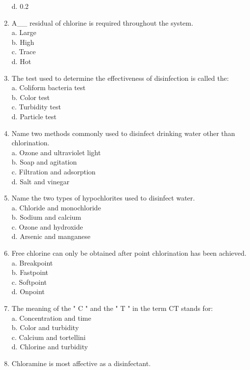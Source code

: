 \begin{enumerate}[1.]
d. 0.2\\
\item A\_\_ residual of chlorine is required throughout the system.\\
a. Large\\
b. High\\
c. Trace\\
d. Hot\\
\item The test used to determine the effectiveness of disinfection is called the:\\
a. Coliform bacteria test\\
b. Color test\\
c. Turbidity test\\
d. Particle test\\
\item Name two methods commonly used to disinfect drinking water other than chlorination.\\
a. Ozone and ultraviolet light\\
b. Soap and agitation\\
c. Filtration and adsorption\\
d. Salt and vinegar\\
\item Name the two types of hypochlorites used to disinfect water.\\
a. Chloride and monochloride\\
b. Sodium and calcium\\
c. Ozone and hydroxide\\
d. Arsenic and manganese\\
\item Free chlorine can only be obtained after point chlorination has been achieved.\\
a. Breakpoint\\
b. Fastpoint\\
c. Softpoint\\
d. Onpoint\\
\item The meaning of the " $\mathrm{C}$ " and the " $\mathrm{T}$ " in the term $\mathrm{CT}$ stands for:\\
a. Concentration and time\\
b. Color and turbidity\\
c. Calcium and tortellini\\
d. Chlorine and turbidity\\
\item Chloramine is most affective as a disinfectant.\\

\end{enumerate}

